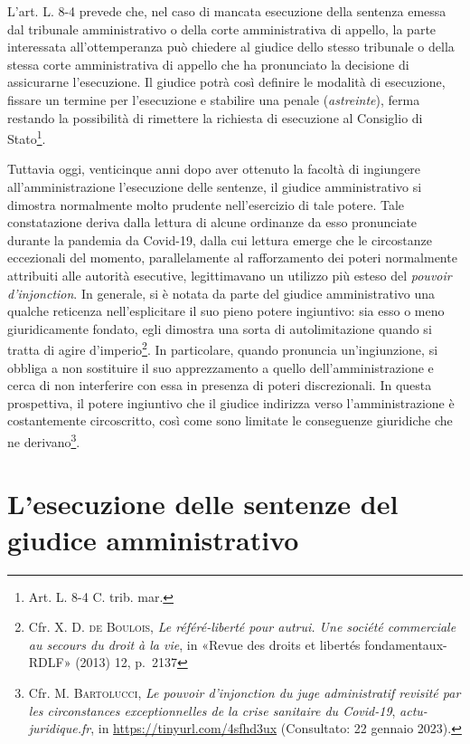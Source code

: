\documentclass[12pt,it,a4paper,]{report}
\begin{document}
L'art. L. 8-4 prevede che, nel caso di mancata esecuzione della sentenza
emessa dal tribunale amministrativo o della corte amministrativa di
appello, la parte interessata all'ottemperanza può chiedere al giudice
dello stesso tribunale o della stessa corte amministrativa di appello
che ha pronunciato la decisione di assicurarne l'esecuzione. Il giudice
potrà così definire le modalità di esecuzione, fissare un termine per
l'esecuzione e stabilire una penale (\emph{astreinte}), ferma restando
la possibilità di rimettere la richiesta di esecuzione al Consiglio di
Stato\footnote{Art. L. 8-4 C. trib. mar.}.

Tuttavia oggi, venticinque anni dopo aver ottenuto la facoltà di
ingiungere all'amministrazione l'esecuzione delle sentenze, il giudice
amministrativo si dimostra normalmente molto prudente nell'esercizio di
tale potere. Tale constatazione deriva dalla lettura di alcune ordinanze
da esso pronunciate durante la pandemia da Covid-19, dalla cui lettura
emerge che le circostanze eccezionali del momento, parallelamente al
rafforzamento dei poteri normalmente attribuiti alle autorità esecutive,
legittimavano un utilizzo più esteso del \emph{pouvoir d'injonction}. In
generale, si è notata da parte del giudice amministrativo una qualche
reticenza nell'esplicitare il suo pieno potere ingiuntivo: sia esso o
meno giuridicamente fondato, egli dimostra una sorta di autolimitazione
quando si tratta di agire d'imperio\footnote{Cfr. X. D. \textsc{de}
  \textsc{Boulois}, \emph{Le référé-liberté pour autrui. Une société
  commerciale au secours du droit à la vie}, in {«Revue des droits et
  libertés fondamentaux-RDLF»} (2013) 12, p.~2137}. In particolare,
quando pronuncia un'ingiunzione, si obbliga a non sostituire il suo
apprezzamento a quello dell'amministrazione e cerca di non interferire
con essa in presenza di poteri discrezionali. In questa prospettiva, il
potere ingiuntivo che il giudice indirizza verso l'amministrazione è
costantemente circoscritto, così come sono limitate le conseguenze
giuridiche che ne derivano\footnote{Cfr. M. \textsc{Bartolucci},
  \emph{Le pouvoir d'injonction du juge administratif revisité par les
  circonstances exceptionnelles de la crise sanitaire du Covid-19},
  \emph{actu-juridique.fr}, in \url{https://tinyurl.com/4sfhd3ux}
  (Consultato: 22 gennaio 2023).}.

\hypertarget{lesecuzione-delle-sentenze-del-giudice-amministrativo}{%
\section{L'esecuzione delle sentenze del giudice
amministrativo}\label{lesecuzione-delle-sentenze-del-giudice-amministrativo}}
\end{document}
